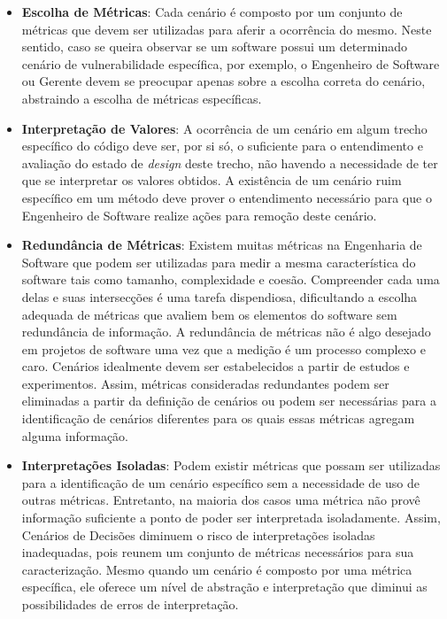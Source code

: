 \begin{itemize}
\item \textbf{Escolha de Métricas}: Cada cenário é composto por um conjunto de métricas que devem ser utilizadas para aferir a ocorrência do mesmo. Neste sentido, caso se queira observar se um software possui um determinado cenário de vulnerabilidade específica, por exemplo, o Engenheiro de Software ou Gerente devem se preocupar apenas sobre a escolha correta do cenário, abstraindo a escolha de métricas específicas.
\item \textbf{Interpretação de Valores}: A ocorrência de um cenário em algum trecho específico do código deve ser, por si só, o suficiente para o entendimento e avaliação do estado de \emph{design} deste trecho, não havendo a necessidade de ter que se interpretar os valores obtidos. A existência de um cenário ruim específico em um  método deve prover o entendimento necessário para que o Engenheiro de Software realize ações para remoção deste cenário.
\item \textbf{Redundância de Métricas}: Existem muitas métricas na Engenharia de Software que podem ser utilizadas para medir a mesma característica do software tais como tamanho, complexidade e coesão. Compreender cada uma delas e suas intersecções é uma tarefa dispendiosa, dificultando a escolha adequada de métricas que avaliem bem os elementos do software sem redundância de informação. A redundância de métricas não é algo desejado em projetos de software uma vez que a medição é um processo complexo e caro. Cenários idealmente devem ser estabelecidos a partir de estudos e experimentos. Assim, métricas consideradas redundantes podem ser eliminadas a partir da definição de cenários ou podem ser necessárias para a identificação de cenários diferentes para os quais essas métricas agregam alguma informação.
\item \textbf{Interpretações Isoladas}: Podem existir métricas que possam ser utilizadas para a identificação de um cenário específico sem a necessidade de uso de outras métricas. Entretanto, na maioria dos casos uma métrica não provê informação suficiente a ponto de poder ser interpretada isoladamente. Assim, Cenários de Decisões diminuem o risco de interpretações isoladas inadequadas, pois reunem um conjunto de métricas necessários para sua caracterização. Mesmo quando um cenário é composto por uma métrica específica, ele oferece um nível de abstração e interpretação que diminui as possibilidades de erros de interpretação.

\end{itemize}
